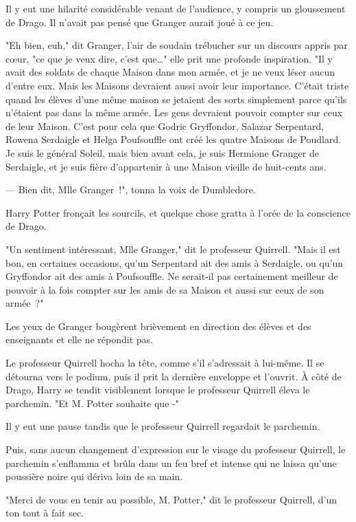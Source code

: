 Il y eut une hilarité considérable venant de l'audience, y compris un gloussement de Drago. Il n'avait pas pensé que Granger aurait joué à ce jeu.

"Eh bien, euh," dit Granger, l'air de soudain trébucher sur un discours appris par cœur, "ce que je veux dire, c'est que…" elle prit une profonde inspiration. "Il y avait des soldats de chaque Maison dans mon armée, et je ne veux léser aucun d'entre eux. Mais les Maisons devraient aussi avoir leur importance. C'était triste quand les élèves d'une même maison se jetaient des sorts simplement parce qu'ils n'étaient pas dans la même armée. Les gens devraient pouvoir compter sur ceux de leur Maison. C'est pour cela que Godric Gryffondor, Salazar Serpentard, Rowena Serdaigle et Helga Poufsouffle ont créé les quatre Maisons de Poudlard. Je suis le général Soleil, mais bien avant cela, je suis Hermione Granger de Serdaigle, et je suis fière d'appartenir à une Maison vieille de huit-cents ans.

--- Bien dit, Mlle Granger~!", tonna la voix de Dumbledore.

Harry Potter fronçait les sourcils, et quelque chose gratta à l'orée de la conscience de Drago.

"Un sentiment intéressant, Mlle Granger," dit le professeur Quirrell. "Mais il est bon, en certaines occasions, qu'un Serpentard ait des amis à Serdaigle, ou qu'un Gryffondor ait des amis à Poufsouffle. Ne serait-il pas certainement meilleur de pouvoir à la fois compter sur les amis de sa Maison et aussi sur ceux de son armée~?"

Les yeux de Granger bougèrent brièvement en direction des élèves et des enseignants et elle ne répondit pas.

Le professeur Quirrell hocha la tête, comme s'il s'adressait à lui-même. Il se détourna vers le podium, puis il prit la dernière enveloppe et l'ouvrit. À côté de Drago, Harry se tendit visiblement lorsque le professeur Quirrell éleva le parchemin. "Et M. Potter souhaite que -"

Il y eut une pause tandis que le professeur Quirrell regardait le parchemin.

Puis, sans aucun changement d'expression sur le visage du professeur Quirrell, le parchemin s'enflamma et brûla dans un feu bref et intense qui ne laissa qu'une poussière noire qui dériva loin de sa main.

"Merci de vous en tenir au possible, M. Potter," dit le professeur Quirrell, d'un ton tout à fait sec.

